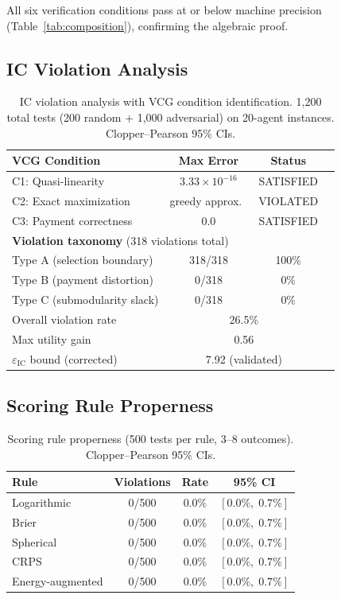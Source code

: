 \documentclass[10pt]{article}
\begin{document}
All six verification conditions pass at or below machine precision (Table~\ref{tab:composition}), confirming the algebraic proof.

\subsection{IC Violation Analysis}

\begin{table}[t]
\centering
\caption{IC violation analysis with VCG condition identification. 1{,}200 total tests (200 random + 1{,}000 adversarial) on 20-agent instances. Clopper--Pearson 95\% CIs.}
\label{tab:ic}
\begin{tabular}{lccc}
\toprule
\textbf{VCG Condition} & \textbf{Max Error} & \textbf{Status} \\
\midrule
C1: Quasi-linearity & $3.33 \times 10^{-16}$ & SATISFIED \\
C2: Exact maximization & greedy approx.\ & VIOLATED \\
C3: Payment correctness & $0.0$ & SATISFIED \\
\midrule
\multicolumn{3}{l}{\textbf{Violation taxonomy} (318 violations total)} \\
\midrule
Type A (selection boundary) & 318/318 & 100\% \\
Type B (payment distortion) & 0/318 & 0\% \\
Type C (submodularity slack) & 0/318 & 0\% \\
\midrule
Overall violation rate & \multicolumn{2}{c}{26.5\%} \\
Max utility gain & \multicolumn{2}{c}{0.56} \\
$\varepsilon_{\mathrm{IC}}$ bound (corrected) & \multicolumn{2}{c}{7.92 (validated)} \\
\bottomrule
\end{tabular}
\end{table}

\subsection{Scoring Rule Properness}

\begin{table}[t]
\centering
\caption{Scoring rule properness (500 tests per rule, 3--8 outcomes). Clopper--Pearson 95\% CIs.}
\label{tab:properness}
\begin{tabular}{lccc}
\toprule
\textbf{Rule} & \textbf{Violations} & \textbf{Rate} & \textbf{95\% CI} \\
\midrule
Logarithmic & 0/500 & 0.0\% & $[0.0\%,\; 0.7\%]$ \\
Brier & 0/500 & 0.0\% & $[0.0\%,\; 0.7\%]$ \\
Spherical & 0/500 & 0.0\% & $[0.0\%,\; 0.7\%]$ \\
CRPS & 0/500 & 0.0\% & $[0.0\%,\; 0.7\%]$ \\
Energy-augmented & 0/500 & 0.0\% & $[0.0\%,\; 0.7\%]$ \\
\bottomrule
\end{tabular}
\end{table}
\end{document}

